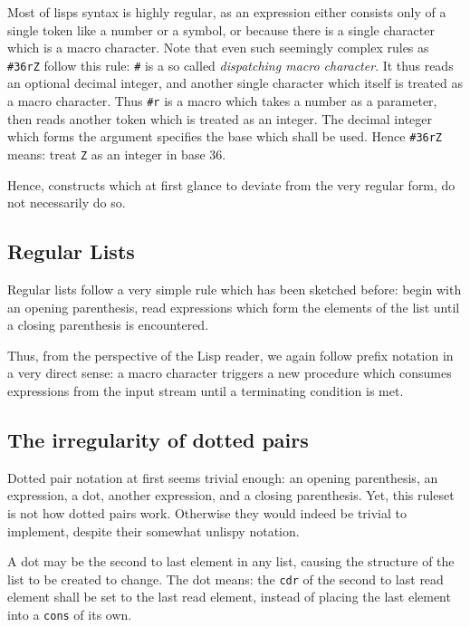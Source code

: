 \documentclass[a4paper,10pt,twoside]{report}
\newcommand{\sym}[1]{\texttt{#1}}
\begin{document}
Most of lisps syntax is highly regular, as an expression either consists only of
a single token like a number or a symbol, or because there is a single character
which is a macro character.  Note that even such seemingly complex rules as
\texttt{\#36rZ} follow this rule: \texttt{\#} is a so called \emph{dispatching
  macro character}.  It thus reads an optional decimal integer, and another
single character which itself is treated as a macro character.  Thus
\texttt{\#r} is a macro which takes a number as a parameter, then reads another
token which is treated as an integer.  The decimal integer which forms the
argument specifies the base which shall be used.  Hence \texttt{\#36rZ} means:
treat \texttt{Z} as an integer in base 36.

Hence, constructs which at first glance to deviate from the very regular form,
do not necessarily do so.

\subsection{Regular Lists}
\label{subsec:regular-lists}

Regular lists follow a very simple rule which has been sketched before: begin
with an opening parenthesis, read expressions which form the elements of the
list until a closing parenthesis is encountered.

Thus, from the perspective of the Lisp reader, we again follow prefix notation
in a very direct sense: a macro character triggers a new procedure which
consumes expressions from the input stream until a terminating condition is met.

\subsection{The irregularity of dotted pairs}
\label{subsec:irregular-dotted-pair}

Dotted pair notation at first seems trivial enough: an opening parenthesis, an
expression, a dot, another expression, and a closing parenthesis.  Yet, this
ruleset is not how dotted pairs work.  Otherwise they would indeed be trivial to
implement, despite their somewhat unlispy notation.

A dot may be the second to last element in any list, causing the structure of
the list to be created to change.  The dot means: the \sym{cdr} of the second to
last read element shall be set to the last read element, instead of placing the
last element into a \sym{cons} of its own.
\end{document}
